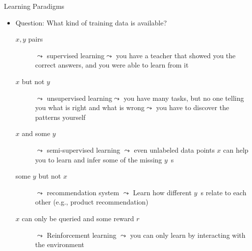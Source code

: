 \documentclass[aspectratio=169]{../latex_main/tntbeamer}  %
\begin{document}
    \begin{frame}[c]{Learning Paradigms}

        \begin{itemize}
            \item \alert{Question}: What kind of training data is available?
            \begin{description}
                \item[$x,y$ pairs] $\leadsto$ supervised learning\newline $\leadsto$ you have a teacher that showed you the correct answers, and you were able to learn from it
                \item[$x$ but not $y$] $\leadsto$ unsupervised learning\newline $\leadsto$ you have many tasks, but no one telling you what is right and what is wrong\newline $\leadsto$ you have to discover the patterns yourself
                \item [$x$ and some $y$] $\leadsto$ semi-supervised learning\newline
                                         $\leadsto$ even unlabeled data points $x$ can help you to learn and infer some of the missing $y$~s
                \item[some $y$ but not $x$] $\leadsto$ recommendation system \newline
                                        $\leadsto$ Learn how different $y$~s relate to each other (e.g., product recommendation)
                \item[ $x$ can only be queried and some reward $r$] $\leadsto$ Reinforcement learning \newline
                    $\leadsto$ you can only learn by interacting with the environment
            \end{description}
            
        \end{itemize}
        
    \end{frame}
\end{document}
